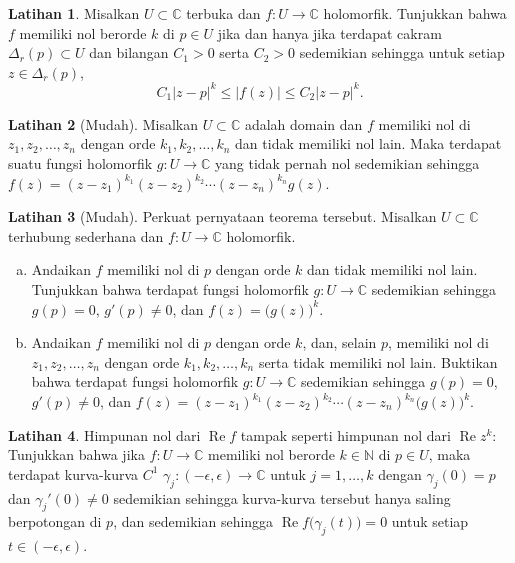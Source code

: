 \documentclass[12pt,openany]{book}
\renewcommand{\Re}{\operatorname{Re}}
\newcommand{\sabs}[1]{\lvert {#1} \rvert}
\newcommand{\C}{{\mathbb{C}}}
\newcommand{\N}{{\mathbb{N}}}
\theoremstyle{plain}
\theoremstyle{remark}
\theoremstyle{definition}
\newenvironment{exbox}{%
    \def\FrameCommand{\vrule width 1pt \relax\hspace{10pt}}%
    \MakeFramed{\advance\hsize-\width\FrameRestore}%
}{%
    \endMakeFramed
}
\newenvironment{exparts}{%
    \leavevmode\begin{enumerate}[a),noitemsep,topsep=0pt,parsep=0pt,partopsep=0pt]
}{%
    \end{enumerate}
}
\theoremstyle{exercise}
\newtheorem{exercise}{Latihan}[section]
\theoremstyle{example}
\begin{document}
\begin{exbox}
\begin{exercise}%
\label{exercise:order}
Misalkan $U \subset \C$ terbuka dan
$f \colon U \to \C$ holomorfik.
Tunjukkan bahwa $f$ memiliki nol berorde $k$ di $p \in U$
jika dan hanya jika
terdapat cakram $\Delta_r(p) \subset U$ dan bilangan $C_1 > 0$ serta $C_2 > 0$
sedemikian sehingga untuk
setiap $z \in \Delta_r(p)$,
\begin{equation*}
C_1 {\sabs{z-p}}^k
\leq
\sabs{f(z)}
\leq
C_2 {\sabs{z-p}}^k .
\end{equation*}
\end{exercise}

\begin{exercise}[Mudah]
Misalkan $U \subset \C$ adalah domain dan $f$
memiliki nol di $z_1, z_2, \ldots, z_n$ dengan
orde $k_1, k_2, \ldots, k_n$ dan tidak memiliki nol lain.
Maka terdapat suatu fungsi holomorfik
$g \colon U \to \C$ yang tidak pernah nol
sedemikian sehingga $f(z) = {(z-z_1)}^{k_1}{(z-z_2)}^{k_2}\cdots{(z-z_n)}^{k_n} g(z).$
\end{exercise}

\begin{exercise}[Mudah]
\pagebreak[2]
Perkuat pernyataan teorema tersebut.
Misalkan $U \subset \C$ terhubung sederhana dan $f \colon U \to \C$
holomorfik.
\begin{exparts}
\item
Andaikan $f$ memiliki nol di $p$ dengan
orde $k$ dan tidak memiliki nol lain.
Tunjukkan bahwa terdapat fungsi holomorfik
$g \colon U \to \C$ sedemikian sehingga $g(p) = 0$, $g'(p) \neq 0$, dan
$f(z) = {\bigl( g(z) \bigr)}^k$.
\item
Andaikan $f$ memiliki nol di $p$
dengan orde $k$,
dan, selain $p$, memiliki nol di $z_1, z_2, \ldots, z_n$ dengan
orde $k_1, k_2, \ldots, k_n$ serta tidak memiliki nol lain.
Buktikan bahwa terdapat fungsi holomorfik
$g \colon U \to \C$ sedemikian sehingga $g(p) = 0$, $g'(p) \neq 0$,
dan
$f(z) = {(z-z_1)}^{k_1}{(z-z_2)}^{k_2}\cdots{(z-z_n)}^{k_n}
{\bigl( g(z) \bigr)}^k$.
\end{exparts}
\end{exercise}

\begin{exercise}
Himpunan nol dari $\Re f$ tampak seperti himpunan nol dari $\Re z^k$:
Tunjukkan bahwa jika $f \colon U \to \C$ memiliki nol berorde $k \in \N$ di $p \in
U$, maka terdapat kurva-kurva $C^1$
$\gamma_j \colon (-\epsilon, \epsilon) \to \C$ untuk
$j=1,\ldots,k$ dengan $\gamma_j(0) = p$
dan $\gamma_j'(0) \neq 0$ sedemikian sehingga kurva-kurva tersebut hanya saling berpotongan
di $p$, dan sedemikian sehingga $\Re f\bigl( \gamma_j(t) \bigr) = 0$ untuk
setiap $t \in (-\epsilon,\epsilon)$.
\end{exercise}


\end{exbox}
\end{document}
